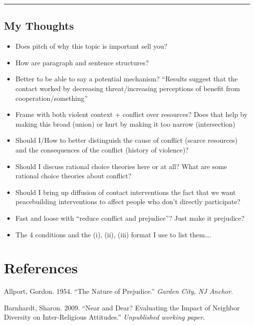 \documentclass[11pt]{article}
\begin{document}
\begin{center}\rule{0.5\linewidth}{\linethickness}\end{center}

\subsection{My Thoughts}\label{my-thoughts}

\smallskip

\begin{itemize}
\item
  Does pitch of why this topic is important sell you?
\item
  How are paragraph and sentence structures?
\item
  Better to be able to say a potential mechanism? ``Results suggest that
  the contact worked by decreasing threat/increasing perceptions of
  benefit from cooperation/something''
\item
  Frame with both violent context + conflict over resources? Does that
  help by making this broad (union) or hurt by making it too narrow
  (intersection)
\item
  Should I/How to better distinguish the cause of conflict (scarce
  resources) and the consequences of the conflict (history of violence)?
\item
  Should I discuss rational choice theories here or at all? What are
  some rational choice theories about conflict?
\item
  Should I bring up diffusion of contact interventions the fact that we
  want peacebuilding interventions to affect people who don't directly
  participate?
\item
  Fast and loose with ``reduce conflict and prejudice''? Just make it
  prejudice?
\item
  The 4 conditions and the (i), (ii), (iii) format I use to list
  them\ldots{}.
\end{itemize}

\section*{References}\label{references}

\hypertarget{refs}{}
\hypertarget{ref-allport1954prejudice}{}
Allport, Gordon. 1954. ``The Nature of Prejudice.'' \emph{Garden City,
NJ Anchor}.

\hypertarget{ref-barnhardt2009near}{}
Barnhardt, Sharon. 2009. ``Near and Dear? Evaluating the Impact of
Neighbor Diversity on Inter-Religious Attitudes.'' \emph{Unpublished
working paper}.
\end{document}
